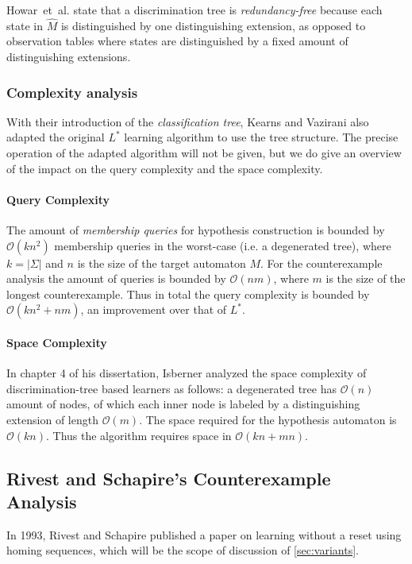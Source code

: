 \documentclass[multi,crop=false,class=article]{standalone}
\begin{document}
Howar~et~al. state that a discrimination tree is \textit{redundancy-free} because
each state in $\hat M$ is distinguished by one distinguishing extension, as
opposed to observation tables where states are distinguished by a fixed amount
of distinguishing extensions\cite{Howar14}.

\subsubsection{Complexity analysis}
\label{sec:complexity-analysis}
With their introduction of the \textit{classification tree}, Kearns and Vazirani
also adapted the original $L^*$ learning algorithm to use the tree
structure\cite{Kearns94}. The precise operation of the adapted algorithm will not
be given, but we do give an overview of the impact on the query complexity and
the space complexity.

\paragraph{Query Complexity} The amount of \textit{membership queries} for
hypothesis construction is bounded by $\mathcal{O}(kn^2)$ membership queries in
the worst-case (i.e. a degenerated tree)\cite{Howar14,Kearns94,Isberner14b},
where $k = |\Sigma |$ and $n$ is the size of the target automaton $M$. For the
counterexample analysis the amount of queries is bounded by $\mathcal{O}(nm)$,
where $m$ is the size of the longest counterexample\cite{Kearns94}. Thus in
total the query complexity is bounded by $\mathcal{O}(kn^2 + nm)$, an
improvement over that of $L^*$.

\paragraph{Space Complexity} In chapter 4 of his dissertation, Isberner analyzed
the space complexity of discrimination-tree based learners as follows: a
degenerated tree has $\mathcal{O}(n)$ amount of nodes, of which each inner node
is labeled by a distinguishing extension of length
$\mathcal{O}(m)$\cite{Isberner15}.  The space required for the hypothesis
automaton is $\mathcal{O}(kn)$\cite{Isberner15}. Thus the algorithm requires
space in $\mathcal{O}(kn + mn)$\cite{Isberner14b,Isberner15}.

\subsection{Rivest and Schapire's Counterexample Analysis}
\label{sec:rivest-schap-count}
In 1993, Rivest and Schapire published a paper on learning without a reset using
homing sequences\cite{Rivest93}, which will be the scope of discussion of
\cref{sec:variants}.
\end{document}
